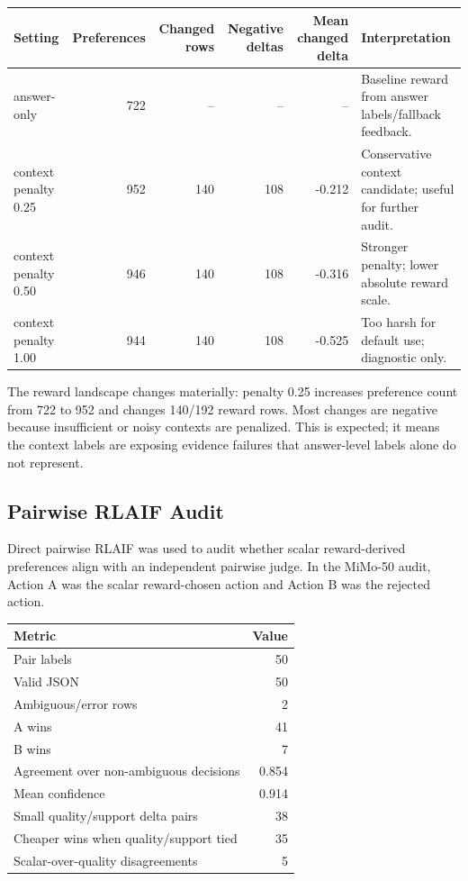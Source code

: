 \begin{center}
\scriptsize
\begin{tabular}{>{\raggedright\arraybackslash}p{2.7cm} r r r r >{\raggedright\arraybackslash}p{3.0cm}}
\toprule
Setting & Preferences & Changed rows & Negative deltas & Mean changed delta & Interpretation \\
\midrule
answer-only & 722 & -- & -- & -- & Baseline reward from answer labels/fallback feedback. \\
context penalty 0.25 & 952 & 140 & 108 & -0.212 & Conservative context candidate; useful for further audit. \\
context penalty 0.50 & 946 & 140 & 108 & -0.316 & Stronger penalty; lower absolute reward scale. \\
context penalty 1.00 & 944 & 140 & 108 & -0.525 & Too harsh for default use; diagnostic only. \\
\bottomrule
\end{tabular}
\end{center}

The reward landscape changes materially: penalty 0.25 increases preference count from 722 to 952 and changes 140/192 reward rows. Most changes are negative because insufficient or noisy contexts are penalized. This is expected; it means the context labels are exposing evidence failures that answer-level labels alone do not represent.

\subsection{Pairwise RLAIF Audit}

Direct pairwise RLAIF was used to audit whether scalar reward-derived preferences align with an independent pairwise judge. In the MiMo-50 audit, Action A was the scalar reward-chosen action and Action B was the rejected action.

\begin{center}
\small
\begin{tabular}{l r}
\toprule
Metric & Value \\
\midrule
Pair labels & 50 \\
Valid JSON & 50 \\
Ambiguous/error rows & 2 \\
A wins & 41 \\
B wins & 7 \\
Agreement over non-ambiguous decisions & 0.854 \\
Mean confidence & 0.914 \\
Small quality/support delta pairs & 38 \\
Cheaper wins when quality/support tied & 35 \\
Scalar-over-quality disagreements & 5 \\
\bottomrule
\end{tabular}
\end{center}

